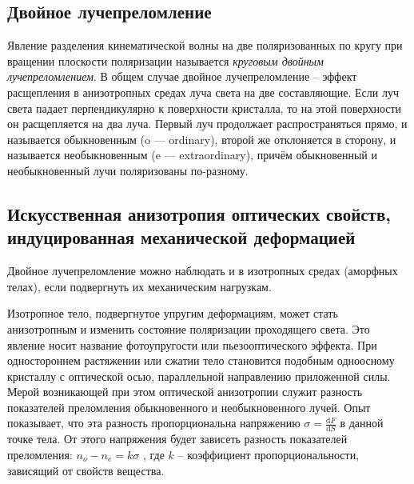 	\subsection{Двойное лучепреломление}
	Явление разделения кинематической волны на две поляризованных по кругу при вращении плоскости поляризации называется \textit{круговым двойным лучепреломлением}. В общем случае двойное лучепреломление -- эффект расщепления в анизотропных средах луча света на две составляющие. Если луч света падает перпендикулярно к поверхности кристалла, то на этой поверхности он расщепляется на два луча. Первый луч продолжает распространяться прямо, и называется обыкновенным (o — ordinary), второй же отклоняется в сторону, и называется необыкновенным (e — extraordinary), причём обыкновенный и необыкновенный лучи поляризованы по-разному.
	\subsection{Искусственная анизотропия оптических свойств, индуцированная механической деформацией}
	Двойное лучепреломление можно наблюдать и в изотропных средах (аморфных телах), если подвергнуть их механическим нагрузкам.
	
	Изотропное тело, подвергнутое упругим деформациям, может стать анизотропным и изменить состояние поляризации проходящего света. Это явление носит название фотоупругости или пьезооптического эффекта. При одностороннем растяжении или сжатии тело становится подобным одноосному кристаллу с оптической осью, параллельной направлению приложенной силы. Мерой возникающей при этом оптической анизотропии служит разность показателей преломления обыкновенного и необыкновенного лучей. Опыт показывает, что эта разность пропорциональна напряжению $\sigma = \frac{\mathrm{d}F}{\mathrm{d}S}$  в данной точке тела. От этого напряжения будет зависеть разность показателей преломления:  $n_{o} - n_{e} = k\sigma$  ,  где $k$ – коэффициент пропорциональности, зависящий от свойств вещества.
	
